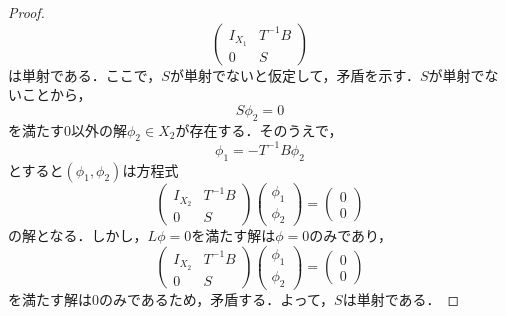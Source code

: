 \begin{proof}
\begin{equation*}
\begin{pmatrix}
      I_{X_1} & T^{-1}B \\
      0 & S
    \end{pmatrix}
  \end{equation*}
  は単射である．ここで，$S$が単射でないと仮定して，矛盾を示す．$S$が単射でないことから，
  \begin{equation*}
    S\phi_2=0
  \end{equation*}
  を満たす$0$以外の解$\phi_2 \in X_2$が存在する．そのうえで，
  \begin{equation*}
    \phi_1 = -T^{-1}B\phi_2
  \end{equation*}
  とすると$(\phi_1, \phi_2)$は方程式
  \begin{equation*}
    \begin{pmatrix}
      I_{X_2} & T^{-1}B \\
      0 & S
    \end{pmatrix}
    \begin{pmatrix}
      \phi_1 \\
      \phi_2
    \end{pmatrix}
    =
    \begin{pmatrix}
      0 \\
      0
    \end{pmatrix}
  \end{equation*}
  の解となる．しかし，$L\phi=0$を満たす解は$\phi=0$のみであり，
  \begin{equation*}
    \begin{pmatrix}
      I_{X_2} & T^{-1}B \\
      0 & S
    \end{pmatrix}
    \begin{pmatrix}
      \phi_1 \\
      \phi_2
    \end{pmatrix}
    =
    \begin{pmatrix}
      0 \\
      0
    \end{pmatrix}
  \end{equation*}
  を満たす解は$0$のみであるため，矛盾する．よって，$S$は単射である．


\end{proof}
